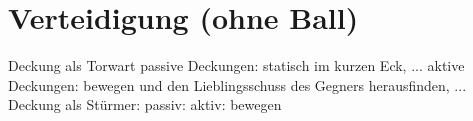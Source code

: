 \section{Verteidigung (ohne Ball)}
Deckung als Torwart
passive Deckungen: statisch im kurzen Eck, ...
aktive Deckungen: bewegen und den Lieblingsschuss des Gegners herausfinden, ...
Deckung als Stürmer:
passiv: 
aktiv: bewegen



